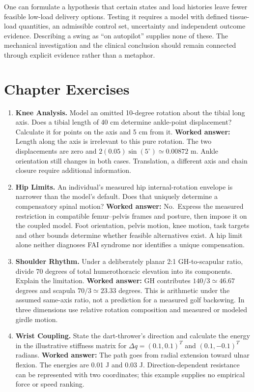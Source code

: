 One can formulate a hypothesis that certain states and load histories leave fewer feasible low-load delivery options. Testing it requires a model with defined tissue-load quantities, an admissible control set, uncertainty and independent outcome evidence. Describing a swing as ``on autopilot'' supplies none of these. The mechanical investigation and the clinical conclusion should remain connected through explicit evidence rather than a metaphor.

\section{Chapter Exercises}\label{sec:ch22_exercises}

\begin{enumerate}
\def\labelenumi{\arabic{enumi}.}
\item
  \textbf{Knee Analysis.} Model an omitted 10-degree rotation about the tibial long axis. Does a tibial length of 40 cm determine ankle-point displacement? Calculate it for points on the axis and 5 cm from it. \textbf{Worked answer:} Length along the axis is irrelevant to this pure rotation. The two displacements are zero and \(2(0.05)\sin(5^\circ)\simeq0.00872\) m. Ankle orientation still changes in both cases. Translation, a different axis and chain closure require additional information.
\item
  \textbf{Hip Limits.} An individual's measured hip internal-rotation envelope is narrower than the model's default. Does that uniquely determine a compensatory spinal motion? \textbf{Worked answer:} No.~Express the measured restriction in compatible femur--pelvis frames and posture, then impose it on the coupled model. Foot orientation, pelvis motion, knee motion, task targets and other bounds determine whether feasible alternatives exist. A hip limit alone neither diagnoses FAI syndrome nor identifies a unique compensation.
\item
  \textbf{Shoulder Rhythm.} Under a deliberately planar 2:1 GH-to-scapular ratio, divide 70 degrees of total humerothoracic elevation into its components. Explain the limitation. \textbf{Worked answer:} GH contributes \(140/3\simeq46.67\) degrees and scapula \(70/3\simeq23.33\) degrees. This is arithmetic under the assumed same-axis ratio, not a prediction for a measured golf backswing. In three dimensions use relative rotation composition and measured or modeled girdle motion.
\item
  \textbf{Wrist Coupling.} State the dart-thrower's direction and calculate the energy in the illustrative stiffness matrix for \(\Delta q=(0.1,0.1)^T\) and \((0.1,-0.1)^T\) radians. \textbf{Worked answer:} The path goes from radial extension toward ulnar flexion. The energies are 0.01 J and 0.03 J. Direction-dependent resistance can be represented with two coordinates; this example supplies no empirical force or speed ranking.

\end{enumerate}
